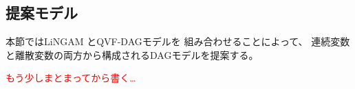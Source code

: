 
\subsection{提案モデル}

本節ではLiNGAM \cite{Shimizu2006-yu}とQVF-DAGモデル\cite{Park2017-hw}を
組み合わせることによって、
連続変数と離散変数の両方から構成されるDAGモデルを提案する。

\textcolor{red}{もう少しまとまってから書く…}
